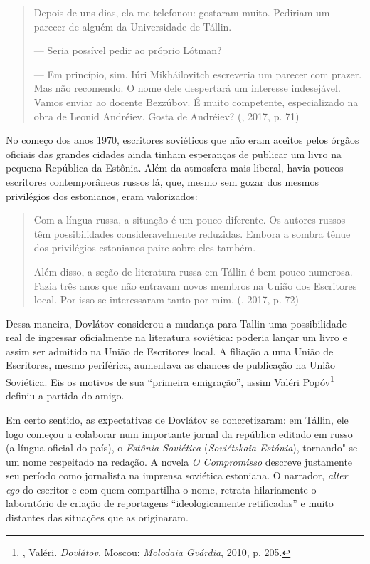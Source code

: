\begin{quotation}
Depois de uns dias, ela me telefonou: gostaram muito. Pe­diriam um
parecer de alguém da Universidade de Tállin.

--- Seria possível pedir ao próprio Lótman?

--- Em princípio, sim. Iúri Mikháilovitch escreveria um pa­recer com
prazer. Mas não recomendo. O nome dele despertará um interesse
indesejável. Vamos enviar ao docente Bezzúbov. É muito competente,
especializado na obra de Leonid Andréiev. Gosta de Andréiev? 
{}(, 2017, p. 71)
\end{quotation}

No começo dos anos 1970, escritores soviéticos que não eram aceitos
pelos órgãos oficiais das grandes cidades ainda tinham esperanças de
publicar um livro na pequena República da Estônia. Além da atmosfera
mais liberal, havia poucos escritores contemporâneos russos lá, que,
mesmo sem gozar dos mesmos privilégios dos estonianos, eram valorizados:

\begin{quotation}
Com a língua russa, a situação é um pouco diferente. Os au­tores russos
têm possibilidades consideravelmente reduzidas. Embora a sombra tênue
dos privilégios estonianos paire sobre eles também.

Além disso, a seção de literatura russa em Tállin é bem pou­co numerosa.
Fazia três anos que não entravam novos mem­bros na União dos Escritores
local. Por isso se interessaram tanto por mim.
{}(, 2017, p. 72)
\end{quotation}

Dessa maneira, Dovlátov considerou a mudança para Tallin uma
possibilidade real de ingressar oficialmente na literatura soviética:
poderia lançar um livro e assim ser admitido na União de Escritores
local. A filiação a uma União de Escritores, mesmo periférica, aumentava
as chances de publicação na União Soviética. Eis os motivos de sua
``primeira emigração'', assim Valéri Popóv\footnote{, Valéri.
  \emph{Dovlátov}. Moscou: \emph{Molodaia Gvárdia}, 2010, p. 205.}
definiu a partida do amigo.

Em certo sentido, as expectativas de Dovlátov se concretizaram: em
Tállin, ele logo começou a colaborar num importante jornal da república
editado em russo (a língua oficial do país), o \emph{Estônia Soviética}
(\emph{Soviétskaia Estónia}), tornando"-se um nome respeitado na redação.
A novela \emph{O Compromisso} descreve justamente seu período como
jornalista na imprensa soviética estoniana. O narrador, \emph{alter ego}
do escritor e com quem compartilha o nome, retrata hilariamente o
laboratório de criação de reportagens ``ideologicamente retificadas'' e
muito distantes das situações que as originaram.


